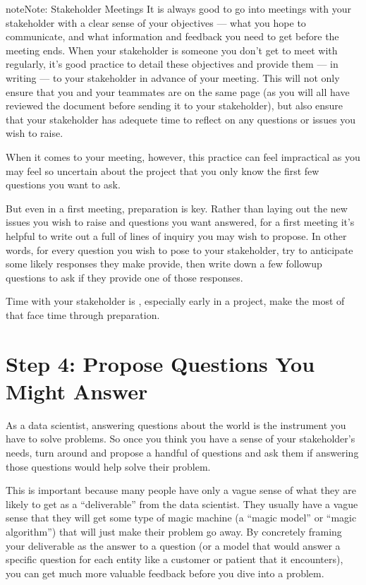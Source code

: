 \documentclass[letterpaper,10pt,english]{jupyterBook}
\begin{document}
\begin{sphinxadmonition}{note}{Note:}
\sphinxAtStartPar
Stakeholder Meetings
It is always good to go into meetings with your stakeholder with a clear sense of your objectives — what you hope to communicate, and what information and feedback you need to get before the meeting ends. When your stakeholder is someone you don’t get to meet with regularly, it’s good practice to detail these objectives and provide them — in writing — to your stakeholder in advance of your meeting. This will not only ensure that you and your teammates are on the same page (as you will all have reviewed the document before sending it to your stakeholder), but also ensure that your stakeholder has adequete time to reflect on any questions or issues you wish to raise.

\sphinxAtStartPar
When it comes to your  meeting, however, this practice can feel impractical as you may feel so uncertain about the project that you only know the first few questions you want to ask.

\sphinxAtStartPar
But even in a first meeting, preparation is key. Rather than laying out the new issues you wish to raise and questions you want answered, for a first meeting it’s helpful to write out a full  of lines of inquiry you may wish to propose. In other words, for every question you wish to pose to your stakeholder, try to anticipate some likely responses they make provide, then write down a few followup questions to ask if they provide one of those responses.

\sphinxAtStartPar
Time with your stakeholder is , especially early in a project, make the most of that face time through preparation.
\end{sphinxadmonition}


\section{Step 4: Propose Questions You Might Answer}
\label{\detokenize{20_problems_to_questions/20_stakeholder_management:step-4-propose-questions-you-might-answer}}
\sphinxAtStartPar
As a data scientist, answering questions about the world is the instrument you have to solve problems. So once you think you have a sense of your stakeholder’s needs, turn around and propose a handful of questions and ask them if answering those questions would help solve their problem.

\sphinxAtStartPar
This is important because many people have only a vague sense of what they are likely to get as a “deliverable” from the data scientist. They usually have a vague sense that they will get some type of magic machine (a “magic model” or “magic algorithm”) that will just make their problem go away. By concretely framing your deliverable as the answer to a question (or a model that would answer a specific question for each entity like a customer or patient that it encounters), you can get much more valuable feedback before you dive into a problem.
\end{document}
